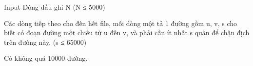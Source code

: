 Input
Dòng đầu ghi N (N ≤ 5000)   


   Các dòng tiếp theo cho đến hết file, mỗi dòng một tả 1 đường gồm u, v, s cho biết có đoạn đường một chiều từ u đến v, và phải cần ít nhất s quân để chặn địch trên đường này. (s ≤ 65000)   


   Có không quá 10000 đường.